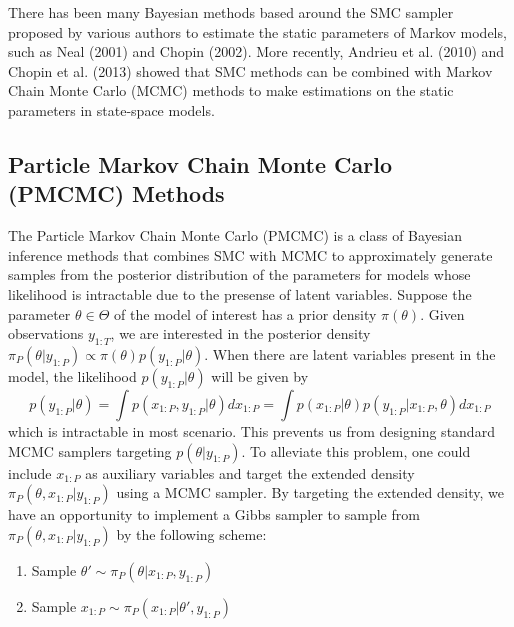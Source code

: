 \documentclass[12pt,a4paper]{article}
\begin{document}
There has been many Bayesian methods based around the SMC sampler proposed by various authors to estimate the static parameters of Markov models, such as Neal (2001) and Chopin (2002). More recently, Andrieu et al. (2010) and Chopin et al. (2013) showed that SMC methods can be combined with Markov Chain Monte Carlo (MCMC) methods to make estimations on the static parameters in state-space models. 
\subsection{Particle Markov Chain Monte Carlo (PMCMC) Methods }
The Particle Markov Chain Monte Carlo (PMCMC) is a class of Bayesian inference methods that combines SMC with MCMC to approximately generate samples from the posterior distribution of the parameters for models whose likelihood is intractable due to the presense of latent variables. Suppose the parameter $\theta \in \Theta$ of the model of interest has a prior density $\pi(\theta)$. Given observations $y_{1:T}$, we are interested in the posterior density $\pi_P(\theta|y_{1:P}) \propto \pi(\theta)p(y_{1:P}|\theta)$. When there are latent variables present in the model, the likelihood $p(y_{1:P}|\theta)$ will be given by 
\begin{equation}
    \label{PMCMC-marginal likelihood}
    p(y_{1:P}|\theta) = \int p(x_{1:P},y_{1:P}|\theta)dx_{1:P} = \int p(x_{1:P}|\theta) p(y_{1:P}|x_{1:P},\theta) dx_{1:P}
\end{equation}
which is intractable in most scenario. This prevents us from designing standard MCMC samplers targeting $p(\theta|y_{1:P})$. To alleviate this problem, one could include $x_{1:P}$ as auxiliary variables and target the extended density $\pi_P(\theta,x_{1:P}|y_{1:P})$ using a MCMC sampler. By targeting the extended density, we have an opportunity to implement a Gibbs sampler to sample from $\pi_P(\theta,x_{1:P}|y_{1:P})$ by the following scheme:
\begin{enumerate}[label=\textit{Step \arabic*.},leftmargin=*]
    \item Sample $\theta' \sim \pi_P(\theta|x_{1:P},y_{1:P})$
    \item Sample $x_{1:P} \sim \pi_P(x_{1:P}|\theta',y_{1:P})$
\end{enumerate}
\end{document}
